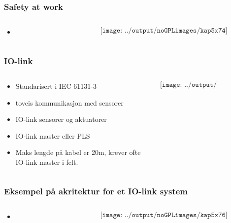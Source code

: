 \documentclass[aspectratio=169,xcolor=dvipsnames]{beamer}
\begin{document}
\begin{frame}
	\frametitle{Safety at work}
	\begin{columns}
		\begin{column}{0.5\textwidth}

			\begin{itemize}
				\item      
			\end{itemize}

			
		\end{column}

		\begin{column}{0.5\textwidth}
	$$\texttt{[image: ../output/noGPLimages/kap5x74]}$$
		\end{column}
	\end{columns}
\end{frame}
\begin{frame}
	\frametitle{IO-link}
	\begin{columns}
		\begin{column}{0.5\textwidth}

			\begin{itemize}
				\item Standarisert i IEC 61131-3
				\item toveis kommunikasjon med sensorer
				\item IO-link sensorer og aktuatorer
				\item IO-link master eller PLS
				\item Maks lengde på kabel er 20m, krever ofte IO-link master i felt. 
			\end{itemize}

			
		\end{column}

		\begin{column}{0.5\textwidth}
	$$\texttt{[image: ../output/noGPLimages/kap5x75]}$$
		\end{column}
	\end{columns}
\end{frame}
\begin{frame}
	\frametitle{Eksempel på akritektur for et IO-link system}
	\begin{columns}
		\begin{column}{0.5\textwidth}

			\begin{itemize}
				\item      
			\end{itemize}

			
		\end{column}

		\begin{column}{0.5\textwidth}
	$$\texttt{[image: ../output/noGPLimages/kap5x76]}$$
		\end{column}
	\end{columns}
\end{frame}
\end{document}
